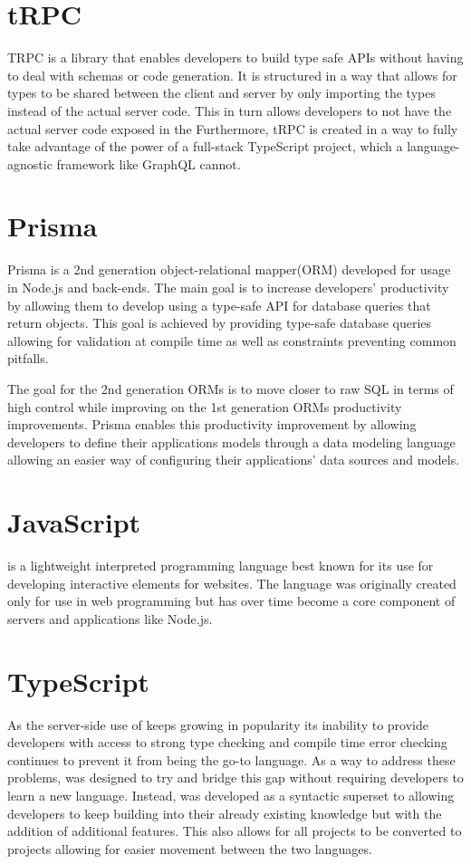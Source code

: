 \section{tRPC}
TRPC is a library that enables developers to build type safe APIs without having to deal with schemas or code generation. 
It is structured in a way that allows for types to be shared between the client and server by only importing the types instead of the actual server code. 
This in turn allows developers to not have the actual server code exposed in the \frontend{} 
Furthermore, tRPC is created in a way to fully take advantage of the power of a full-stack TypeScript project, which a language-agnostic framework like GraphQL cannot\cite{tRPC}.

\section{Prisma}
Prisma is a 2nd generation object-relational mapper(ORM) developed for usage in Node.js and \typescript{} back-ends. 
The main goal is to increase developers' productivity by allowing them to develop using a type-safe API for database queries that return \javascript{} objects. 
This goal is achieved by providing type-safe database queries allowing for validation at compile time as well as constraints preventing common pitfalls\cite{Prisma_Why}.

The goal for the 2nd generation ORMs is to move closer to raw SQL in terms of high control while improving on the 1st generation ORMs productivity improvements. 
Prisma enables this productivity improvement by allowing developers to define their applications models through a data modeling language allowing an easier way of configuring their applications' data sources and models\cite{Prisma_Doc}.

\section{JavaScript}
\javascript{} is a lightweight interpreted programming language best known for its use for developing interactive elements for websites\cite{JavaScript_Mozilla}.
The language was originally created only for use in web programming but has over time become a core component of servers and applications like Node.js. 


\section{TypeScript}
As the server-side use of \javascript{} keeps growing in popularity its inability to provide developers with access to strong type checking and compile time error checking continues to prevent it from being the go-to language.
As a way to address these problems, \typescript{} was designed to try and bridge this gap without requiring developers to learn a new language.
Instead, \typescript{} was developed as a syntactic superset to \javascript{} allowing developers to keep building into their already existing knowledge but with the addition of additional features. 
This also allows for all \javascript{} projects to be converted to \typescript{} projects allowing for easier movement between the two languages\cite{TypeScript}. 

